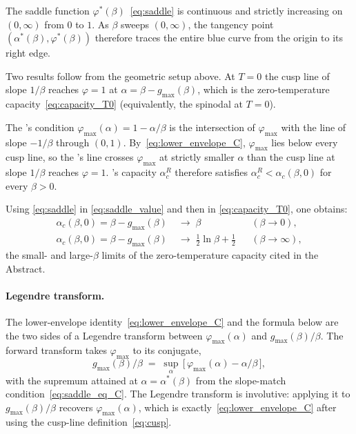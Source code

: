 \documentclass[letterpaper]{article} %
\newcommand{\Bnet}{\beta}
\newcommand{\ac}{\alpha_c}
\begin{document}
The saddle function $\varphi^*(\Bnet)$~\eqref{eq:saddle} is
continuous and strictly increasing on $(0, \infty)$ from $0$ to $1$. As $\Bnet$ sweeps $(0, \infty)$,
the tangency point $(\alpha^*(\Bnet), \varphi^*(\Bnet))$ therefore traces the
entire blue curve from the origin to its right edge.

Two results follow from the geometric setup above.  At $T = 0$ the
cusp line of slope $1/\Bnet$ reaches $\varphi = 1$ at
$\alpha = \Bnet - g_{\max}(\Bnet)$, which is the zero-temperature
capacity~\eqref{eq:capacity_T0} (equivalently, the spinodal at
$T = 0$).

The \citeauthor{ramsauer2021hopfield}'s condition
$\varphi_{\max}(\alpha) = 1 - \alpha/\Bnet$ is the intersection of
$\varphi_{\max}$ with the line of slope $-1/\Bnet$ through $(0, 1)$.
By~\eqref{eq:lower_envelope_C}, $\varphi_{\max}$ lies below every
cusp line, so the \citeauthor{ramsauer2021hopfield}'s line crosses $\varphi_{\max}$ at strictly
smaller $\alpha$ than the cusp line at slope $1/\Bnet$ reaches
$\varphi = 1$.  \citeauthor{ramsauer2021hopfield}'s capacity $\alpha_c^R$ therefore satisfies
$\alpha_c^R < \alpha_c(\Bnet, 0)$ for every $\Bnet > 0$.

Using \eqref{eq:saddle} in
\eqref{eq:saddle_value} and then in \eqref{eq:capacity_T0}, one obtains:
\begin{equation}
\begin{aligned}
\ac(\Bnet, 0) = \Bnet - g_{\max}(\Bnet) &\;\to\; \Bnet
   && (\Bnet \to 0),\\
\ac(\Bnet, 0) = \Bnet - g_{\max}(\Bnet) &\;\to\; \tfrac{1}{2}\ln\Bnet + \tfrac{1}{2}
   && (\Bnet \to \infty),
\end{aligned}
\label{eq:asymptotic_C}
\end{equation}
the small- and large-$\Bnet$ limits of the zero-temperature capacity
cited in the Abstract.

\paragraph{Legendre transform.}
The lower-envelope identity~\eqref{eq:lower_envelope_C} and the formula
below are the two sides of a Legendre transform between
$\varphi_{\max}(\alpha)$ and $g_{\max}(\Bnet)/\Bnet$.  The forward
transform takes $\varphi_{\max}$ to its conjugate,
\begin{equation}
g_{\max}(\Bnet)/\Bnet \;=\; \sup_\alpha\,\bigl[\,\varphi_{\max}(\alpha) - \alpha/\Bnet\,\bigr],
\label{eq:legendre_C}
\end{equation}
with the supremum attained at $\alpha = \alpha^*(\Bnet)$ from the
slope-match condition~\eqref{eq:saddle_eq_C}.  The Legendre transform
is involutive: applying it to $g_{\max}(\Bnet)/\Bnet$ recovers
$\varphi_{\max}(\alpha)$, which is exactly~\eqref{eq:lower_envelope_C}
after using the cusp-line definition~\eqref{eq:cusp}.
\end{document}
